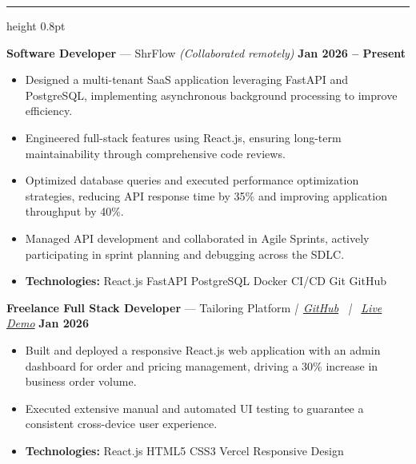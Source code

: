 \documentclass[10pt,a4paper]{article}
\newcommand{\resumesection}[1]{%
  \vspace{5pt}%
  \noindent{\large\textbf{#1}}\par
  \vspace{2pt}%
  \hrule height 0.8pt
  \vspace{4pt}%
}
\begin{document}
\resumesection{WORK EXPERIENCE}

\noindent\textbf{Software Developer} --- ShrFlow \textit{(Collaborated remotely)} \hfill \textbf{Jan 2026 -- Present}
\begin{itemize}[leftmargin=1.2em, topsep=1pt, itemsep=0pt, parsep=0pt]
    \item Designed a multi-tenant SaaS application leveraging FastAPI and PostgreSQL, implementing asynchronous background processing to improve efficiency.
    \item Engineered full-stack features using React.js, ensuring long-term maintainability through comprehensive code reviews.
    \item Optimized database queries and executed performance optimization strategies, reducing API response time by 35\% and improving application throughput by 40\%.
    \item Managed API development and collaborated in Agile Sprints, actively participating in sprint planning and debugging across the SDLC.
    \item \textbf{Technologies:} React.js \textbullet{} FastAPI \textbullet{} PostgreSQL \textbullet{} Docker \textbullet{} CI/CD \textbullet{} Git \textbullet{} GitHub
\end{itemize}

\vspace{4pt}

\noindent\textbf{Freelance Full Stack Developer} --- Tailoring Platform \textit{|\ \href{https://github.com/Rahul-pamula}{GitHub} \ | \ \href{https://tailoring-red.vercel.app}{Live Demo}} \hfill \textbf{Jan 2026}
\begin{itemize}[leftmargin=1.2em, topsep=1pt, itemsep=0pt, parsep=0pt]
    \item Built and deployed a responsive React.js web application with an admin dashboard for order and pricing management, driving a 30\% increase in business order volume.
    \item Executed extensive manual and automated UI testing to guarantee a consistent cross-device user experience.
    \item \textbf{Technologies:} React.js \textbullet{} HTML5 \textbullet{} CSS3 \textbullet{} Vercel \textbullet{} Responsive Design
\end{itemize}
\end{document}
